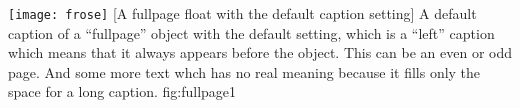 \documentclass[twoside]{scrartcl}
\begin{document}
\Float[capPos=oddPage]
%
  {\texttt{[image: frose]}}%
  [A fullpage float with the default caption setting]%
  {A default caption of a ``fullpage'' object with the default setting, which
   is a ``left''  caption which means that it always appears before the object.
   This can be an even or odd page. And some more text whch has no
   real meaning because it fills only the space for a long caption.}%
  {fig:fullpage1}

\blinddocument


\Blindtext
\end{document}
